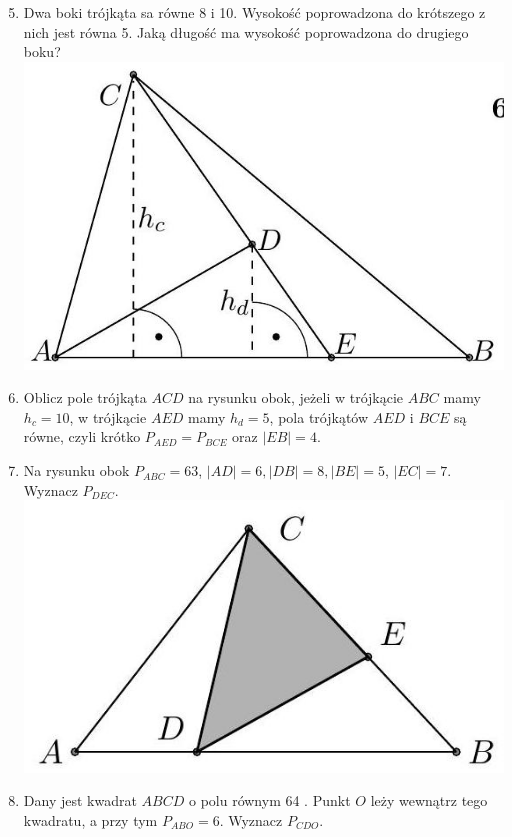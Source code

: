 \documentclass[10pt]{article}
\begin{document}
\begin{enumerate}
  \setcounter{enumi}{4}
  \item Dwa boki trójkąta sa równe 8 i 10. Wysokość poprowadzona do krótszego z nich jest równa 5. Jaką długość ma wysokość poprowadzona do drugiego boku?\\
\includegraphics[max width=\textwidth, center]{2024_11_21_71f62bd117d375398909g-032(2)}
  \item Oblicz pole trójkąta \(A C D\) na rysunku obok, jeżeli w trójkącie \(A B C\) mamy \(h_{c}=10\), w trójkącie \(A E D\) mamy \(h_{d}=5\), pola trójkątów \(A E D\) i \(B C E\) są równe, czyli krótko \(P_{A E D}=P_{B C E}\) oraz \(|E B|=4\).
  \item Na rysunku obok \(P_{A B C}=63\), \(|A D|=6,|D B|=8,|B E|=5\), \(|E C|=7\). Wyznacz \(P_{D E C}\).\\
\includegraphics[max width=\textwidth, center]{2024_11_21_71f62bd117d375398909g-032(1)}
  \item Dany jest kwadrat \(A B C D\) o polu równym 64 . Punkt \(O\) leży wewnątrz tego kwadratu, a przy tym \(P_{A B O}=6\). Wyznacz \(P_{C D O}\).

\end{enumerate}
\end{document}
